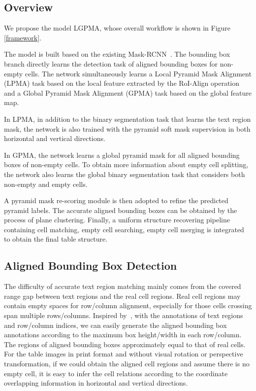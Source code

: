 \documentclass[runningheads]{llncs}
\begin{document}
\subsection{Overview}
We propose the model LGPMA, whose overall workflow is shown in Figure \ref{framework}.

The model is built based on the existing Mask-RCNN~\cite{he2017mask}. The bounding box branch directly learns the detection task of aligned bounding boxes for non-empty cells. The network simultaneously learns a Local Pyramid Mask Alignment (LPMA) task based on the local feature extracted by the RoI-Align operation and a Global Pyramid Mask Alignment (GPMA) task based on the global feature map.

In LPMA, in addition to the binary segmentation task that learns the text region mask, the network is also trained with the pyramid soft mask supervision in both horizontal and vertical directions.

In GPMA, the network learns a global pyramid mask for all aligned bounding boxes of non-empty cells. To obtain more information about empty cell splitting, the network also learns the global binary segmentation task that considers both non-empty and empty cells.

A pyramid mask re-scoring module is then adopted to refine the predicted pyramid labels. The accurate aligned bounding boxes can be obtained by the process of plane clustering. Finally, a uniform structure recovering pipeline containing cell matching, empty cell searching, empty cell merging is integrated to obtain the final table structure.

\subsection{Aligned Bounding Box Detection}

The difficulty of accurate text region matching mainly comes from the covered range gap between text regions and the real cell regions. Real cell regions may contain empty spaces for row/column alignment, especially for those cells crossing span multiple rows/columns.
Inspired by~\cite{raja2020table,xue2019res2tim}, with the annotations of text regions and row/column indices, we can easily generate the aligned bounding box annotations according to the maximum box height/width in each row/column. The regions of aligned bounding boxes approximately equal to that of real cells.
For the table images in print format and without visual rotation or perspective transformation, if we could obtain the aligned cell regions and assume there is no empty cell, it is easy to infer the cell relations according to the coordinate overlapping information in horizontal and vertical directions.
\end{document}
